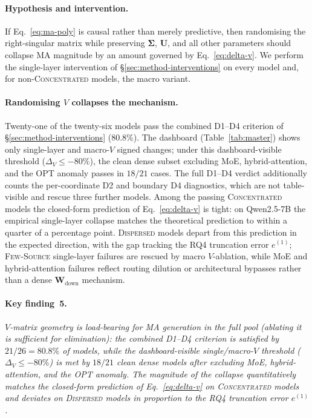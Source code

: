 \documentclass{article}
\newcommand{\Wdown}{\mathbf{W}_{\text{down}}}
\begin{document}
\paragraph{Hypothesis and intervention.}
If Eq.~\eqref{eq:ma-poly} is causal rather than merely predictive, then
randomising the right-singular matrix while preserving
$\boldsymbol{\Sigma}$, $\mathbf{U}$, and all other parameters should collapse
MA magnitude by an amount governed by Eq.~\eqref{eq:delta-v}.
We perform the single-layer intervention of
\S\ref{sec:method-interventions} on every model and, for
non-\textsc{Concentrated} models, the macro variant.

\paragraph{Randomising $V$ collapses the mechanism.}
Twenty-one of the twenty-six models pass the combined D1--D4 criterion of
\S\ref{sec:method-interventions} ($80.8\%$). The dashboard
(Table~\ref{tab:master}) shows only single-layer and macro-$V$ signed
changes; under this dashboard-visible threshold ($\Delta_V \leq -80\%$),
the clean dense subset excluding MoE, hybrid-attention, and the OPT
anomaly passes in $18/21$ cases. The full D1--D4 verdict additionally
counts the per-coordinate D2 and boundary D4 diagnostics, which are not
table-visible and rescue three further models. Among
the passing \textsc{Concentrated} models the closed-form prediction of
Eq.~\eqref{eq:delta-v} is tight: on Qwen2.5-7B the empirical single-layer
collapse matches the theoretical prediction to within a quarter of a
percentage point. \textsc{Dispersed} models depart from this prediction in the
expected direction, with the gap tracking the RQ4 truncation error
$e^{(1)}$; \textsc{Few-Source} single-layer failures are rescued by macro
$V$-ablation, while MoE and hybrid-attention failures reflect routing
dilution or architectural bypasses rather than a dense $\Wdown$ mechanism.

\paragraph{Key finding~5.}
\emph{$V$-matrix geometry is load-bearing for MA generation in the
full pool (ablating it is sufficient for elimination): the combined D1--D4 criterion is satisfied by
$21/26 = 80.8\%$ of models, while the dashboard-visible single/macro-$V$
threshold ($\Delta_V \leq -80\%$) is met by $18/21$ clean dense models
after excluding MoE, hybrid-attention, and the OPT anomaly. The
magnitude of the collapse quantitatively matches the closed-form prediction
of Eq.~\eqref{eq:delta-v} on \textsc{Concentrated} models and deviates on
\textsc{Dispersed} models in proportion to the RQ4 truncation error
$e^{(1)}$.}
\end{document}
